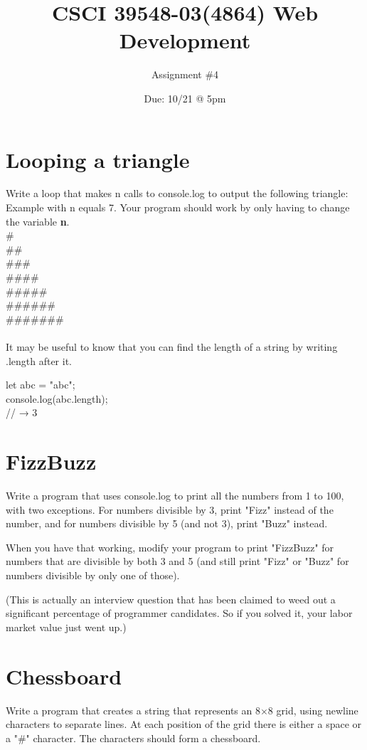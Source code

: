 \documentclass[a4paper]{article}
\title{CSCI 39548-03(4864) Web Development}
\author{Assignment \#4}
\date{Due: 10/21 @ 5pm}
\begin{document}
\maketitle

\section{Looping a triangle}
Write a loop that makes n calls to console.log to output the following triangle:\\
Example with n equals 7. Your program should work by only having to change the variable \textbf{n}.\\
\# \\
\#\#\\
\#\#\#\\
\#\#\#\#\\
\#\#\#\#\#\\
\#\#\#\#\#\#\\
\#\#\#\#\#\#\#\\\\
It may be useful to know that you can find the length of a string by writing .length after it.

let abc = "abc";\\
console.log(abc.length);\\
// → 3


\section{FizzBuzz}
Write a program that uses console.log to print all the numbers from 1 to 100, with two exceptions. For numbers divisible by 3, print "Fizz" instead of the number, and for numbers divisible by 5 (and not 3), print "Buzz" instead.

When you have that working, modify your program to print "FizzBuzz" for numbers that are divisible by both 3 and 5 (and still print "Fizz" or "Buzz" for numbers divisible by only one of those).

(This is actually an interview question that has been claimed to weed out a significant percentage of programmer candidates. So if you solved it, your labor market value just went up.)
\newpage

\section{Chessboard}
Write a program that creates a string that represents an 8$\times$8 grid, using newline characters to separate lines. At each position of the grid there is either a space or a "\#" character. The characters should form a chessboard.
\end{document}
